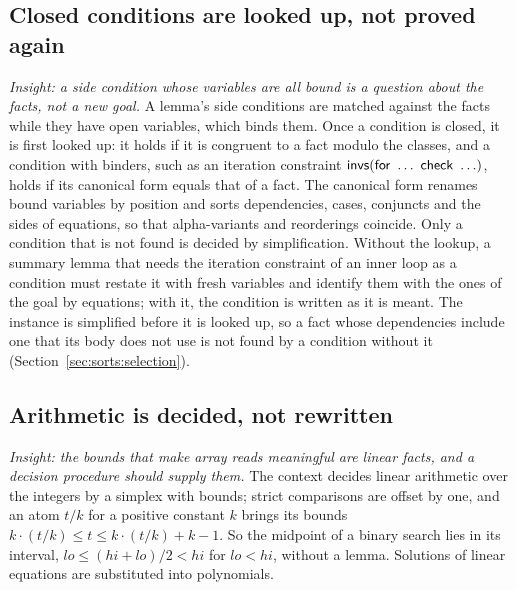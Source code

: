 \subsection{Closed conditions are looked up, not proved again}\label{sec:engine:known}
\emph{Insight: a side condition whose variables are all bound is a question about the facts, not a new goal.}
A lemma's side conditions are matched against the facts while they have open variables, which binds them. Once
a condition is closed, it is first looked up: it holds if it is congruent to a fact modulo the classes, and a
condition with binders, such as an iteration constraint $\mathsf{invs}(\mathsf{for}\ \ldots\ \mathsf{check}\ \ldots)$, holds if its canonical form
equals that of a fact. The canonical form renames bound variables by position and sorts dependencies, cases,
conjuncts and the sides of equations, so that alpha-variants and reorderings coincide. Only a condition that
is not found is decided by simplification. Without the lookup, a summary lemma that needs the iteration
constraint of an inner loop as a condition must restate it with fresh variables and identify them with the
ones of the goal by equations; with it, the condition is written as it is meant. The instance is simplified before
it is looked up, so a fact whose dependencies include one that its body does not use is not found by a condition
without it (Section~\ref{sec:sorts:selection}).

\subsection{Arithmetic is decided, not rewritten}\label{sec:engine:arith}
\emph{Insight: the bounds that make array reads meaningful are linear facts, and a decision procedure should
supply them.} The context decides linear arithmetic over the integers by a simplex with bounds; strict
comparisons are offset by one, and an atom $t / k$ for a positive constant $k$ brings its bounds
$k \cdot (t / k) \le t \le k \cdot (t / k) + k - 1$. So the midpoint of a binary search lies in its interval,
$lo \le (hi + lo) / 2 < hi$ for $lo < hi$, without a lemma. Solutions of linear equations are substituted into
polynomials.


